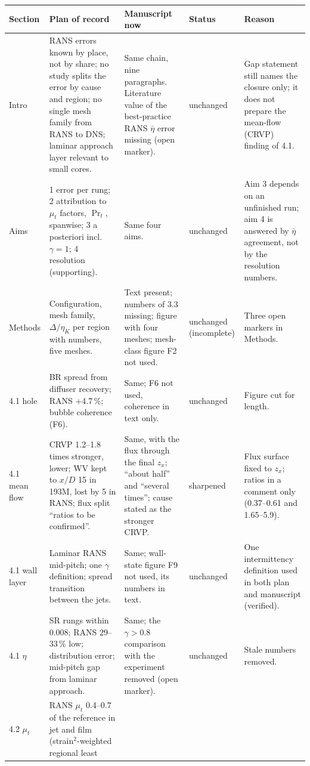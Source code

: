 \documentclass[10pt]{article}
\newcommand{\st}[1]{\textsf{\small #1}}
\begin{document}
{\footnotesize
\begin{longtable}{@{}L{1.5cm} L{4.8cm} L{5.0cm} L{1.5cm} L{3.9cm}@{}}
\toprule
Section & Plan of record & Manuscript now & Status & Reason \\
\midrule
\endhead
Intro & RANS errors known by place, not by share; no study splits the error by cause and region; no single
mesh family from RANS to DNS; laminar approach layer relevant to small cores. & Same chain, nine paragraphs.
Literature value of the best-practice RANS $\bar\eta$ error missing (open marker). & \st{unchanged} & Gap
statement still names the closure only; it does not prepare the mean-flow (CRVP) finding of 4.1. \\
Aims & 1 error per rung; 2 attribution to $\mu_t$ factors, $\Pr_t$, spanwise; 3 a posteriori incl.\ $\gamma=1$;
4 resolution (supporting). & Same four aims. & \st{unchanged} & Aim 3 depends on an unfinished run; aim 4 is
answered by $\bar\eta$ agreement, not by the resolution numbers. \\
Methods & Configuration, mesh family, $\Delta/\eta_K$ per region with numbers, five meshes. & Text present;
numbers of 3.3 missing; figure with four meshes; mesh-class figure F2 not used. & \st{unchanged} (incomplete) &
Three open markers in Methods. \\
4.1 hole & BR spread from diffuser recovery; RANS +4.7\,\%; bubble coherence (F6). & Same; F6 not used, coherence
in text only. & \st{unchanged} & Figure cut for length. \\
4.1 mean flow & CRVP 1.2--1.8 times stronger, lower; WV kept to $x/D$ 15 in 193M, lost by 5 in RANS; flux split
``ratios to be confirmed''. & Same, with the flux through the final $z_x$; ``about half'' and ``several times'';
cause stated as the stronger CRVP. & \st{sharpened} & Flux surface fixed to $z_x$; ratios in a comment only
(0.37--0.61 and 1.65--5.9). \\
4.1 wall layer & Laminar RANS mid-pitch; one $\gamma$ definition; spread transition between the jets. & Same;
wall-state figure F9 not used, its numbers in text. & \st{unchanged} & One intermittency definition used in both
plan and manuscript (verified). \\
4.1 $\eta$ & SR rungs within 0.008; RANS 29--33\,\% low; distribution error; mid-pitch gap from laminar
approach. & Same; the $\gamma>0.8$ comparison with the experiment removed (open marker). & \st{unchanged} & Stale
numbers removed. \\
4.2 $\mu_t$ & RANS $\mu_t$ 0.4--0.7 of the reference in jet and film (strain$^2$-weighted regional least

\end{longtable}}
\end{document}
